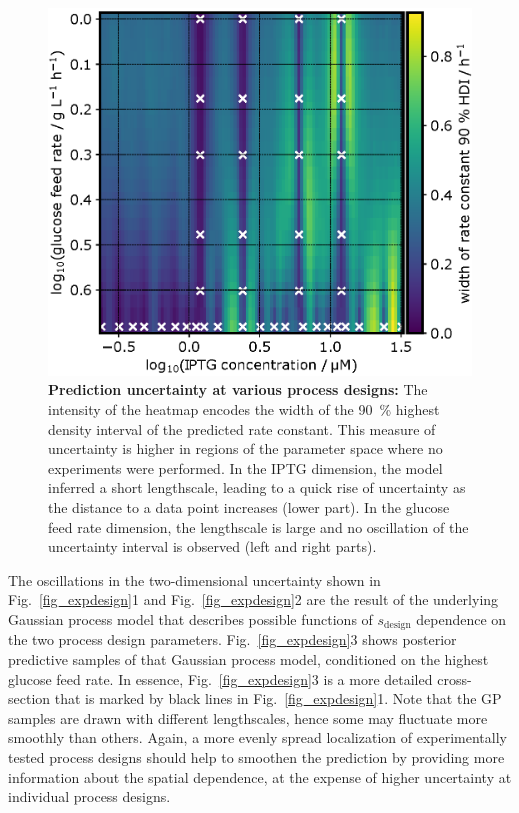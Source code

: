 \documentclass[sn-standardnature]{sn-jnl}%
\theoremstyle{thmstyleone}%
\theoremstyle{thmstyletwo}%
\theoremstyle{thmstylethree}%
\begin{document}
\begin{figure}[H]
    \centering
    \includegraphics[width=1.0\textwidth]{figures/Fig12.eps}
    \caption{
        \textbf{Prediction uncertainty at various process designs:}
        The intensity of the heatmap encodes the width of the 90~\% highest density interval of the predicted rate constant.
        This measure of uncertainty is higher in regions of the parameter space where no experiments were performed.
        In the IPTG dimension, the model inferred a short lengthscale, leading to a quick rise of uncertainty as the distance to a data point increases (lower part).
        In the glucose feed rate dimension, the lengthscale is large and no oscillation of the uncertainty interval is observed (left and right parts).
    }
    \label{fig_sdesign_interval}
\end{figure}

The oscillations in the two-dimensional uncertainty shown in Fig.~\ref{fig_expdesign}1 and Fig.~\ref{fig_expdesign}2 are the result of the underlying Gaussian process model that describes possible functions of $s_\text{design}$ dependence on the two process design parameters.
Fig.~\ref{fig_expdesign}3 shows posterior predictive samples of that Gaussian process model, conditioned on the highest glucose feed rate.
In essence, Fig.~\ref{fig_expdesign}3 is a more detailed cross-section that is marked by black lines in Fig.~\ref{fig_expdesign}1.
Note that the GP samples are drawn with different lengthscales, hence some may fluctuate more smoothly than others.
Again, a more evenly spread localization of experimentally tested process designs should help to smoothen the prediction by providing more information about the spatial dependence, at the expense of higher uncertainty at individual process designs.
\end{document}
